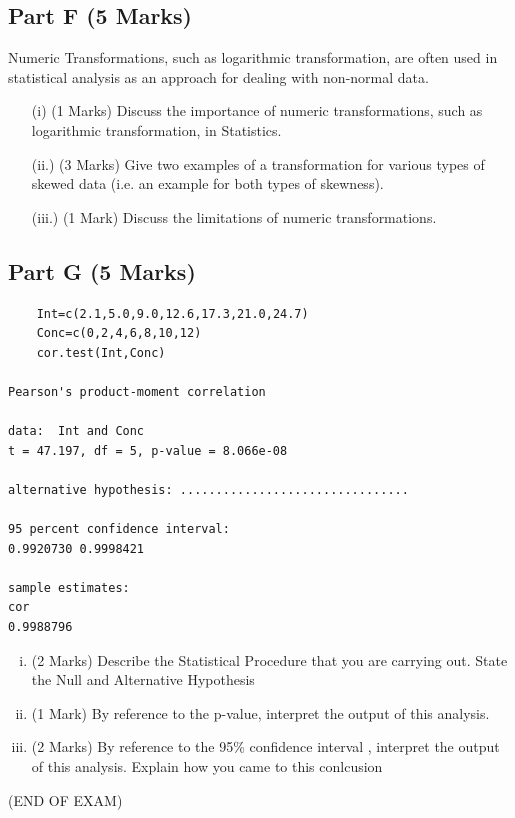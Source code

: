 \documentclass[a4paper,12pt]{article}
\begin{document}
	
	
	
\bigskip


	\subsection*{Part F (5 Marks)}
	Numeric Transformations, such as logarithmic transformation, are often used in statistical analysis as an approach for dealing with non-normal data.
	\begin{itemize}
		\item[(i)] (1 Marks) Discuss the importance of numeric transformations, such as logarithmic transformation, in Statistics.
		\item[(ii.)] (3 Marks) Give two examples of a transformation for various types of skewed data (i.e. an example for both types of skewness).
		\item[(iii.)] (1 Mark) Discuss the limitations of numeric transformations.
	\end{itemize}
	


\newpage

\subsection*{Part G (5 Marks)}

\begin{framed}
	\begin{verbatim}
	Int=c(2.1,5.0,9.0,12.6,17.3,21.0,24.7)
	Conc=c(0,2,4,6,8,10,12)
	cor.test(Int,Conc)

Pearson's product-moment correlation

data:  Int and Conc
t = 47.197, df = 5, p-value = 8.066e-08

alternative hypothesis: ................................

95 percent confidence interval:
0.9920730 0.9998421

sample estimates:
cor 
0.9988796 

	\end{verbatim}
\end{framed}

\begin{enumerate}[(i)]
	\item (2 Marks) Describe the Statistical Procedure that you are carrying out. State the Null and Alternative Hypothesis
	\item (1 Mark) By reference to the p-value, interpret the output of this analysis.
	\item (2 Marks) By reference to the 95\% confidence interval
	, interpret the output of this analysis. Explain how you came to this conlcusion
\end{enumerate}
\newpage
(END OF EXAM)
\end{document}

